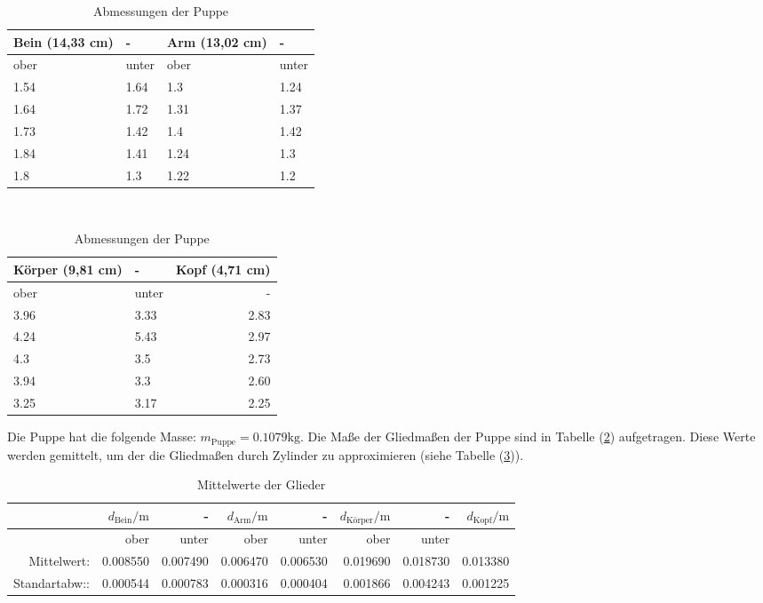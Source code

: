 \begin{table}
  \centering
  \caption{Abmessungen der Puppe}
  \label{tab:Abmessungen}
  \begin{tabular}{llll}
    \toprule
    Bein (14,33 cm) & - & Arm (13,02 cm) & - \\
    \midrule
               ober &      unter &           ober &      unter \\
               1.54 &       1.64 &            1.3 &       1.24 \\
               1.64 &       1.72 &           1.31 &       1.37 \\
               1.73 &       1.42 &            1.4 &       1.42 \\
               1.84 &       1.41 &           1.24 &        1.3 \\
                1.8 &        1.3 &           1.22 &        1.2 \\
    \bottomrule
    \end{tabular}\\

    \begin{tabular}{llr}
      \toprule
      Körper (9,81 cm) & - &  Kopf (4,71 cm) \\
      \midrule
                  ober &      unter &             - \\
                  3.96 &       3.33 &            2.83 \\
                  4.24 &       5.43 &            2.97 \\
                   4.3 &        3.5 &            2.73 \\
                  3.94 &        3.3 &            2.60 \\
                  3.25 &       3.17 &            2.25 \\
      \bottomrule
      \end{tabular}
\end{table}

Die Puppe hat die folgende Masse: $m_{\text{Puppe}} = 0.1079\unit{\kilo\gram}$.
Die Maße der Gliedmaßen der Puppe sind in Tabelle (\ref{tab:Abmessungen}) aufgetragen.
Diese Werte werden gemittelt, um der die Gliedmaßen durch Zylinder zu approximieren (siehe Tabelle (\ref{tab:MittelwertGlieder})).

\begin{table}
  \centering
  \caption{Mittelwerte der Glieder}
  \label{tab:MittelwertGlieder}
  \begin{tabular}{rrrrrrrr}
    \toprule
       & $d_{\text{Bein}} / \unit\meter$ &     - &     $d_{\text{Arm}} / \unit\meter$ &     - &    $d_{\text{Körper}} /  \unit\meter$ &     - &    $d_{\text{Kopf}} /  \unit\meter$\\
    \midrule
     & ober & unter & ober & unter& ober & unter & \\
    Mittelwert: & 0.008550 & 0.007490 & 0.006470 & 0.006530 & 0.019690 & 0.018730 & 0.013380 \\
    Standartabw:: & 0.000544 & 0.000783 & 0.000316 & 0.000404 & 0.001866 & 0.004243 & 0.001225 \\
    \bottomrule
    \end{tabular}
\end{table}

